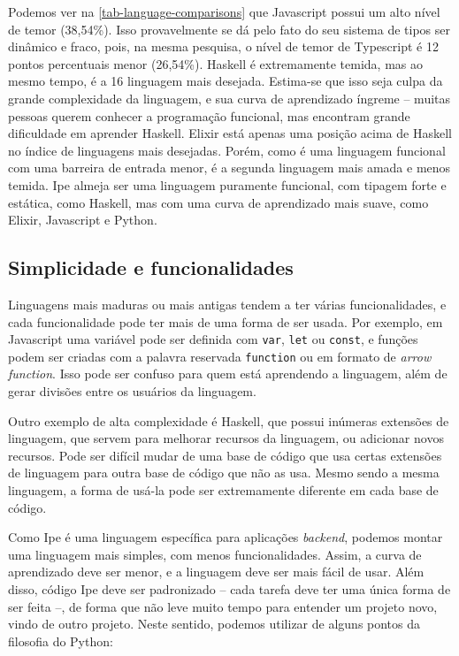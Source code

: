 Podemos ver na \autoref{tab-language-comparisons} que Javascript possui um alto nível de temor (38,54\%). Isso
provavelmente se dá pelo fato do seu sistema de tipos ser dinâmico e fraco, pois,
na mesma pesquisa, o nível de temor de Typescript é 12 pontos percentuais menor
(26,54\%). Haskell é extremamente temida, mas ao mesmo tempo, é a 16\textordfeminine{}
linguagem mais desejada. Estima-se que isso seja culpa da grande complexidade da
linguagem, e sua curva de aprendizado íngreme -- muitas pessoas querem conhecer
a programação funcional, mas encontram grande dificuldade em aprender Haskell.
Elixir está apenas uma posição acima de Haskell no índice de linguagens mais
desejadas. Porém, como é uma linguagem funcional com uma barreira de entrada menor,
é a segunda linguagem mais amada e menos temida. Ipe almeja ser uma linguagem
puramente funcional, com tipagem forte e estática, como Haskell, mas com uma
curva de aprendizado mais suave, como Elixir, Javascript e Python.


\subsection{Simplicidade e funcionalidades}

Linguagens mais maduras ou mais antigas tendem a ter várias funcionalidades, e
cada funcionalidade pode ter mais de uma forma de ser usada. Por exemplo, em
Javascript uma variável pode ser definida com \texttt{var}, \texttt{let} ou
\texttt{const}, e funções podem ser criadas com a palavra reservada \texttt{function}
ou em formato de \textit{arrow function}. Isso pode ser confuso para quem está
aprendendo a linguagem, além de gerar divisões entre os usuários da linguagem.

Outro exemplo de alta complexidade é Haskell, que possui inúmeras extensões de
linguagem, que servem para melhorar recursos da linguagem, ou adicionar novos
recursos. Pode ser difícil mudar de uma base de código que usa certas extensões
de linguagem para outra base de código que não as usa. Mesmo sendo a mesma linguagem,
a forma de usá-la pode ser extremamente diferente em cada base de código.

Como Ipe é uma linguagem específica para aplicações \textit{backend}, podemos
montar uma linguagem mais simples, com menos funcionalidades. Assim, a curva de
aprendizado deve ser menor, e a linguagem deve ser mais fácil de usar. Além disso,
código Ipe deve ser padronizado -- cada tarefa deve ter uma única forma de ser feita --,
de forma que não leve muito tempo para entender um projeto novo, vindo de outro projeto.
Neste sentido, podemos utilizar de alguns pontos da filosofia do Python:

